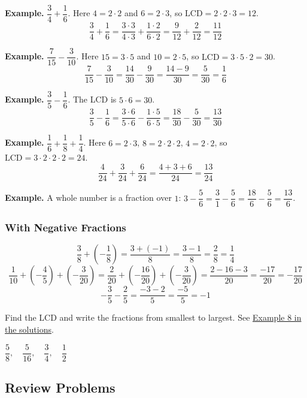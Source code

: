 \documentclass[letter]{article}
\newcommand{\exbox}[1]{\fbox{\textbf{Example #1}}}
\newcommand{\chp}{}
\newcommand{\seesol}[1]{See \hyperref[sec:\chp ex#1]{Example #1 in the solutions}.}
\begin{document}
\textbf{Example.} $\dfrac34+\dfrac16$. Here $4=2\cdot2$ and $6=2\cdot3$, so $\text{LCD}=2\cdot2\cdot3=12$.
\[\frac34+\frac16=\frac{3\cdot3}{4\cdot3}+\frac{1\cdot2}{6\cdot2}=\frac9{12}+\frac2{12}=\frac{11}{12}\]

\textbf{Example.} $\dfrac7{15}-\dfrac3{10}$. Here $15=3\cdot5$ and $10=2\cdot5$, so $\text{LCD}=3\cdot5\cdot2=30$.
\[\frac7{15}-\frac3{10}=\frac{14}{30}-\frac9{30}=\frac{14-9}{30}=\frac5{30}=\frac16\]

\textbf{Example.} $\dfrac35-\dfrac16$. The LCD is $5\cdot6=30$.
\[\frac35-\frac16=\frac{3\cdot6}{5\cdot6}-\frac{1\cdot5}{6\cdot5}=\frac{18}{30}-\frac5{30}=\frac{13}{30}\]

\textbf{Example.} $\dfrac16+\dfrac18+\dfrac14$. Here $6=2\cdot3$, $8=2\cdot2\cdot2$, $4=2\cdot2$, so $\text{LCD}=3\cdot2\cdot2\cdot2=24$.
\[\frac4{24}+\frac3{24}+\frac6{24}=\frac{4+3+6}{24}=\frac{13}{24}\]

\textbf{Example.} A whole number is a fraction over $1$: $3-\dfrac56=\dfrac31-\dfrac56=\dfrac{18}6-\dfrac56=\dfrac{13}6$.

\subsubsection*{With Negative Fractions}
\[\frac38+\left(-\frac18\right)=\frac{3+(-1)}8=\frac{3-1}8=\frac28=\frac14\]
\[
  \frac1{10}+\left(-\frac45\right)+\left(-\frac3{20}\right)
  =\frac2{20}+\left(-\frac{16}{20}\right)+\left(-\frac3{20}\right)
  =\frac{2-16-3}{20}=\frac{-17}{20}=-\frac{17}{20}
\]
\[-\frac35-\frac25=\frac{-3-2}5=\frac{-5}5=-1\]

\exbox{8} Find the LCD and write the fractions from smallest to largest. \seesol{8}

\begin{center}
$\dfrac58,\quad\dfrac5{16},\quad\dfrac34,\quad\dfrac12$
\end{center}


\subsection{Review Problems}
\end{document}
